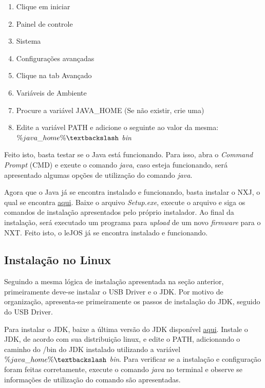 	\begin{enumerate}
		\item Clique em iniciar
		\item Painel de controle
		\item Sistema
		\item Configurações avançadas
		\item Clique na tab Avançado
		\item Variáveis de Ambiente
		\item Procure a variável JAVA\_HOME (Se não existir, crie uma)
		\item Edite a variável PATH e adicione o seguinte ao valor da mesma: \textit{$\%java\_home\% \textbackslash$ bin}
	\end{enumerate}

	Feito isto, basta testar se o Java está funcionando. Para isso, abra o \textit{Command Prompt} (CMD) e exeute o comando \textit{java}, caso esteja funcionando, será apresentado algumas opções de utilização do comando \textit{java}.

	Agora que o Java já se encontra instalado e funcionando, basta instalar o NXJ, o qual se encontra \href{http://www.lejos.org/}{aqui}. Baixe o arquivo \textit{Setup.exe}, execute o arquivo e siga os comandos de instalação apresentados pelo próprio instalador. Ao final da instalação, será executado um programa para \textit{upload} de um novo \textit{firmware} para o NXT. Feito isto, o leJOS já se encontra instalado e funcionando.

\subsection{Instalação no Linux} %
\label{sub:instalação_no_linux}

	Seguindo a mesma lógica de instalação apresentada na seção anterior, primeiramente deve-se instalar o USB Driver e o JDK. Por motivo de organização, apresenta-se primeiramente os passos de instalação do JDK, seguido do USB Driver.

	Para instalar o JDK, baixe a última versão do JDK disponível \href{http://www.oracle.com/technetwork/java/}{aqui}. Instale o JDK, de acordo com sua distribuição linux, e edite o PATH, adicionando o caminho do /bin do JDK instalado utilizando a variável \textit{$\%java\_home\% \textbackslash$ bin}. Para verificar se a instalação e configuração foram feitas corretamente, execute o comando \textit{java} no terminal e observe se informações de utilização do comando são apresentadas.

